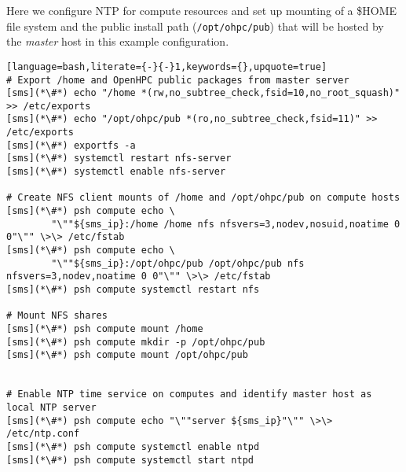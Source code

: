 Here we configure NTP for compute resources and set up \NFS{}  mounting of a
\$HOME file system and the public \OHPC{} install path (\texttt{/opt/ohpc/pub})
that will be hosted by the {\em master} host in this  example configuration.

\vspace*{0.15cm}
\begin{lstlisting}[language=bash,literate={-}{-}1,keywords={},upquote=true]
# Export /home and OpenHPC public packages from master server
[sms](*\#*) echo "/home *(rw,no_subtree_check,fsid=10,no_root_squash)" >> /etc/exports
[sms](*\#*) echo "/opt/ohpc/pub *(ro,no_subtree_check,fsid=11)" >> /etc/exports
[sms](*\#*) exportfs -a
[sms](*\#*) systemctl restart nfs-server
[sms](*\#*) systemctl enable nfs-server

# Create NFS client mounts of /home and /opt/ohpc/pub on compute hosts
[sms](*\#*) psh compute echo \
        "\""${sms_ip}:/home /home nfs nfsvers=3,nodev,nosuid,noatime 0 0"\"" \>\> /etc/fstab
[sms](*\#*) psh compute echo \
        "\""${sms_ip}:/opt/ohpc/pub /opt/ohpc/pub nfs nfsvers=3,nodev,noatime 0 0"\"" \>\> /etc/fstab
[sms](*\#*) psh compute systemctl restart nfs

# Mount NFS shares
[sms](*\#*) psh compute mount /home
[sms](*\#*) psh compute mkdir -p /opt/ohpc/pub
[sms](*\#*) psh compute mount /opt/ohpc/pub


# Enable NTP time service on computes and identify master host as local NTP server
[sms](*\#*) psh compute echo "\""server ${sms_ip}"\"" \>\> /etc/ntp.conf
[sms](*\#*) psh compute systemctl enable ntpd
[sms](*\#*) psh compute systemctl start ntpd

\end{lstlisting}

